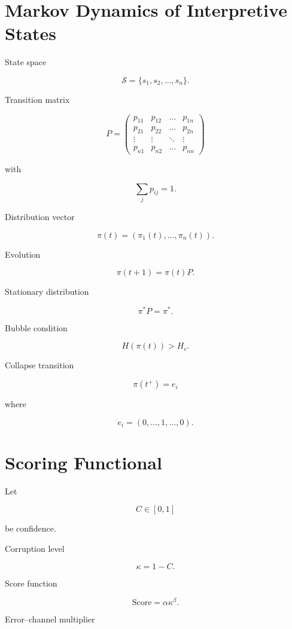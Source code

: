 \documentclass[11pt]{article}
\begin{document}
\section{Markov Dynamics of Interpretive States}

State space

\[
\mathcal{S} = \{s_1,s_2,\dots,s_n\}.
\]

Transition matrix

\[
P =
\begin{pmatrix}
p_{11} & p_{12} & \dots & p_{1n} \\
p_{21} & p_{22} & \dots & p_{2n} \\
\vdots & \vdots & \ddots & \vdots \\
p_{n1} & p_{n2} & \dots & p_{nn}
\end{pmatrix}
\]

with

\[
\sum_j p_{ij} = 1.
\]

Distribution vector

\[
\pi(t) =
(\pi_1(t),\dots,\pi_n(t)).
\]

Evolution

\[
\pi(t+1) = \pi(t)P.
\]

Stationary distribution

\[
\pi^* P = \pi^*.
\]

Bubble condition

\[
H(\pi(t)) > H_c.
\]

Collapse transition

\[
\pi(t^+) = e_i
\]

where

\[
e_i = (0,\dots,1,\dots,0).
\]


\section{Scoring Functional}

Let

\[
C \in [0,1]
\]

be confidence.

Corruption level

\[
\kappa = 1 - C.
\]

Score function

\[
\text{Score} = \alpha \kappa^\beta.
\]

Error–channel multiplier
\end{document}
